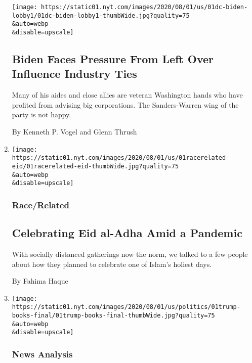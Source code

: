 \begin{enumerate}
  \texttt{[image: https://static01.nyt.com/images/2020/08/01/us/01dc-biden-lobby1/01dc-biden-lobby1-thumbWide.jpg?quality=75\\\&auto=webp\\\&disable=upscale]}

  \hypertarget{biden-faces-pressure-from-left-over-influence-industry-ties}{%
  \subsection{Biden Faces Pressure From Left Over Influence Industry
  Ties}\label{biden-faces-pressure-from-left-over-influence-industry-ties}}

  Many of his aides and close allies are veteran Washington hands who
  have profited from advising big corporations. The Sanders-Warren wing
  of the party is not happy.

  By Kenneth P. Vogel and Glenn Thrush
\item
  \href{/2020/08/01/us/eid-al-adha-coronavirus.html}{}

  \texttt{[image: https://static01.nyt.com/images/2020/08/01/us/01racerelated-eid/01racerelated-eid-thumbWide.jpg?quality=75\\\&auto=webp\\\&disable=upscale]}

  \hypertarget{racerelated-1}{%
  \subsubsection{Race/Related}\label{racerelated-1}}

  \hypertarget{celebrating-eid-al-adha-amid-a-pandemic-1}{%
  \subsection{Celebrating Eid al-Adha Amid a
  Pandemic}\label{celebrating-eid-al-adha-amid-a-pandemic-1}}

  With socially distanced gatherings now the norm, we talked to a few
  people about how they planned to celebrate one of Islam's holiest
  days.

  By Fahima Haque
\item
  \href{/2020/08/01/us/politics/trump-books.html}{}

  \texttt{[image: https://static01.nyt.com/images/2020/08/01/us/politics/01trump-books-final/01trump-books-final-thumbWide.jpg?quality=75\\\&auto=webp\\\&disable=upscale]}

  \hypertarget{news-analysis}{%
  \subsubsection{News Analysis}\label{news-analysis}}


\end{enumerate}
